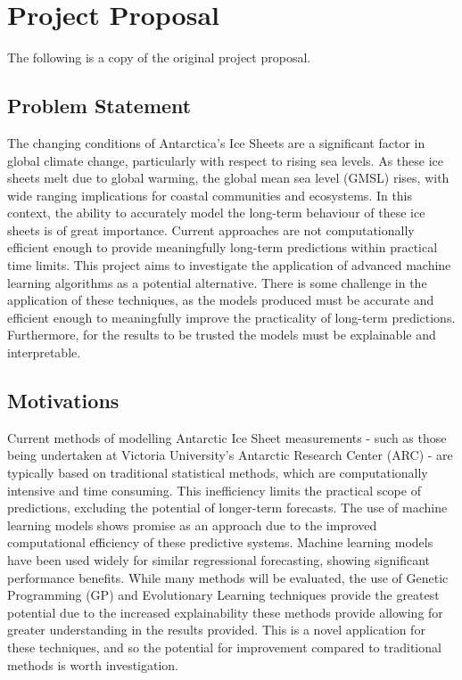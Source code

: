 \chapter{Project Proposal}\label{C:project_proposal}

The following is a copy of the original project proposal.

\section{Problem Statement}

The changing conditions of Antarctica’s Ice Sheets are a significant factor in global climate change, particularly with respect to rising sea levels. As these ice sheets melt due to global warming, the global mean sea level (GMSL) rises, with wide ranging implications for coastal communities and ecosystems. In this context, the ability to accurately model the long-term behaviour of these ice sheets is of great importance. Current approaches are not computationally efficient enough to provide meaningfully long-term predictions within practical time limits. This project aims to investigate the application of advanced machine learning algorithms as a potential alternative. There is some challenge in the application of these techniques, as the models produced must be accurate and efficient enough to meaningfully improve the practicality of long-term predictions. Furthermore, for the results to be trusted the models must be explainable and interpretable. 

\section{Motivations}

Current methods of modelling Antarctic Ice Sheet measurements - such as those being undertaken at Victoria University’s Antarctic Research Center (ARC) - are typically based on traditional statistical methods, which are computationally intensive and time consuming. This inefficiency limits the practical scope of predictions, excluding the potential of longer-term forecasts. The use of machine learning models shows promise as an approach due to the improved computational efficiency of these predictive systems. Machine learning models have been used widely for similar regressional forecasting, showing significant performance benefits. While many methods will be evaluated, the use of Genetic Programming (GP) and Evolutionary Learning techniques provide the greatest potential due to the increased explainability these methods provide allowing for greater understanding in the results provided. This is a novel application for these techniques, and so the potential for improvement compared to traditional methods is worth investigation. 

